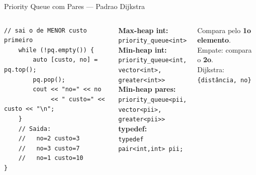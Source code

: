 \documentclass[aspectratio=169,10pt]{beamer}
\begin{document}
\begin{frame}[fragile,shrink=3]{Priority Queue com Pares --- Padrao Dijkstra}
\begin{columns}[t]
\begin{tcolorbox}[caixaCodigo]
\begin{lstlisting}[style=cppsmall]
    // sai o de MENOR custo primeiro
    while (!pq.empty()) {
        auto [custo, no] = pq.top();
        pq.pop();
        cout << "no=" << no
             << " custo=" << custo << "\n";
    }
    // Saida:
    //   no=2 custo=3
    //   no=3 custo=7
    //   no=1 custo=10
}
        \end{lstlisting}
      \end{tcolorbox}
      \begin{tcolorbox}[caixaAzul,title={Declaracoes comuns}]
        \footnotesize
        \textbf{Max-heap int:}\\
        \texttt{priority\_queue<int>}\\[4pt]
        \textbf{Min-heap int:}\\
        \texttt{priority\_queue<int,}\\
        \texttt{vector<int>,}\\
        \texttt{greater<int>>}\\[4pt]
        \textbf{Min-heap pares:}\\
        \texttt{priority\_queue<pii,}\\
        \texttt{vector<pii>,}\\
        \texttt{greater<pii>>}\\[4pt]
        \textbf{typedef:}\\
        \texttt{typedef pair<int,int> pii;}
      \end{tcolorbox}
      \vspace{0.08cm}
      \begin{tcolorbox}[caixaVerde,title={Comparação de pares}]
        \footnotesize
        Compara pelo \textbf{1o elemento}.\\
        Empate: compara o \textbf{2o}.\\[3pt]
        Dijkstra: \texttt{\{distância, no\}}
      \end{tcolorbox}
  \end{columns}
\end{frame}
\end{document}
